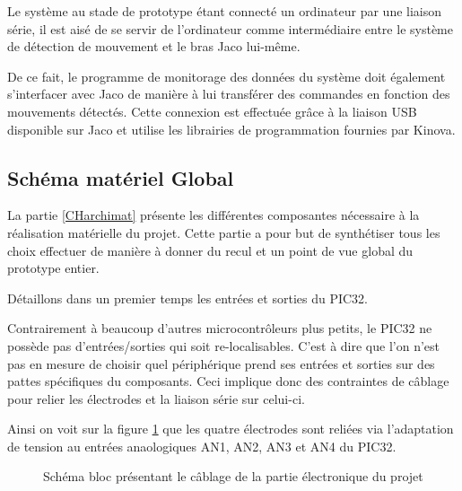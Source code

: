 \documentclass[letterpaper, twoside, 12pt, memoire, creativecommons, hyperref]{thETS}
\begin{document}
Le système au stade de prototype étant connecté un ordinateur par une liaison série, il est aisé de se servir de l'ordinateur comme intermédiaire entre le système de détection de mouvement et le bras Jaco lui-même.

De ce fait, le programme de monitorage des données du système doit également s'interfacer avec Jaco de manière à lui transférer des commandes en fonction des mouvements détectés. Cette connexion est effectuée grâce à la liaison USB disponible sur Jaco et utilise les librairies de programmation fournies par Kinova.

\subsection{Schéma matériel Global}

La partie \ref{CHarchimat} présente les différentes composantes nécessaire à la réalisation matérielle du projet. Cette partie a pour but de synthétiser tous les choix effectuer de manière à donner du recul et un point de vue global du prototype entier. 

Détaillons dans un premier temps les entrées et sorties du PIC32. 

Contrairement à beaucoup d'autres microcontrôleurs plus petits, le PIC32 ne possède pas d'entrées/sorties qui soit re-localisables. C'est à dire que l'on n'est pas en mesure de choisir quel périphérique prend ses entrées et sorties sur des pattes spécifiques du composants. Ceci implique donc des contraintes de câblage pour relier les électrodes et la liaison série sur celui-ci. 

Ainsi on voit sur la figure \ref{fig:cablagePic} que les quatre électrodes sont reliées via l'adaptation de tension au entrées anaologiques AN1, AN2, AN3 et AN4 du PIC32. 

\begin{figure}
	\centering
	\caption{Schéma bloc présentant le câblage de la partie électronique du projet}
	\label{fig:cablagePic}
\end{figure}
\end{document}
